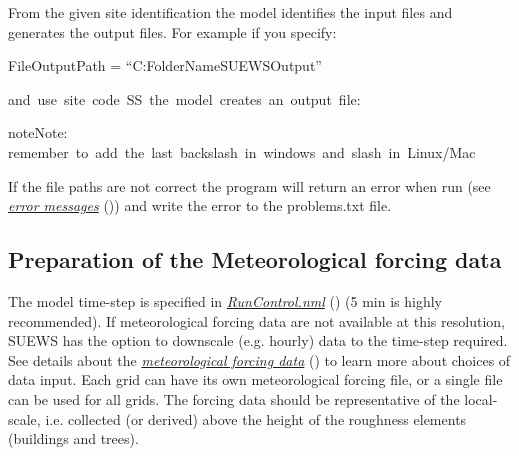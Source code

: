 \documentclass[letterpaper,10pt,english]{sphinxmanual}
\begin{document}
From the given site identification the model identifies the input files
and generates the output files. For example if you specify:

%
\begin{sphinxVerbatim}[commandchars=\\\{\}]
FileOutputPath = “C:\PYGZbs{}FolderName\PYGZbs{}SUEWSOutput\PYGZbs{}”
\end{sphinxVerbatim}

and use site code SS the model creates an output file:

%
\begin{sphinxVerbatim}[commandchars=\\\{\}]
\PYGZbs{}\PYGZbs{}\PYGZbs{}
\end{sphinxVerbatim}

\begin{sphinxadmonition}{note}{Note:}
remember to add the last backslash in windows and slash in Linux/Mac
\end{sphinxadmonition}

If the file paths are not correct the program will return an error when
run (see {\hyperref[\detokenize{prepare-to-run-the-model:Error_messages:_problems.txt}]{\emph{error messages}}} ()) and write
the error to the problems.txt file.


\subsection{Preparation of the Meteorological forcing data}
\label{\detokenize{prepare-to-run-the-model:preparation-of-the-meteorological-forcing-data}}
The model time-step is specified in {\hyperref[\detokenize{prepare-to-run-the-model:RunControl.nml}]{\emph{RunControl.nml}}} ()
(5 min is highly recommended). If meteorological forcing data are not
available at this resolution, SUEWS has the option to downscale (e.g.
hourly) data to the time-step required. See details about the
{\hyperref[\detokenize{prepare-to-run-the-model:SSss_YYYY_data_tt.txt}]{\emph{meteorological forcing data}}} () to learn more
about choices of data input. Each grid can have its own meteorological
forcing file, or a single file can be used for all grids. The forcing
data should be representative of the local-scale, i.e. collected (or
derived) above the height of the roughness elements (buildings and
trees).
\end{document}
